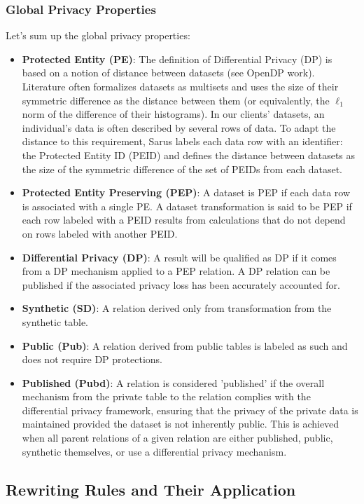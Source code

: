 \documentclass[letterpaper]{article} %
\begin{document}
\subsubsection{Global Privacy Properties}
\label{sec:global_privacy_properties}
Let's sum up the global privacy properties:
\begin{itemize}
    \item \textbf{Protected Entity (PE)}: The definition of Differential Privacy (DP) is based on a notion of distance between datasets (see OpenDP work). Literature often formalizes datasets as multisets and uses the size of their symmetric difference as the distance between them (or equivalently, the $\ell_1$ norm of the difference of their histograms). In our clients' datasets, an individual's data is often described by several rows of data. To adapt the distance to this requirement, Sarus labels each data row with an identifier: the Protected Entity ID (PEID) and defines the distance between datasets as the size of the symmetric difference of the set of PEIDs from each dataset.
    \item \textbf{Protected Entity Preserving (PEP)}: A dataset is PEP if each data row is associated with a single PE. A dataset transformation is said to be PEP if each row labeled with a PEID results from calculations that do not depend on rows labeled with another PEID.
    \item \textbf{Differential Privacy (DP)}: A result will be qualified as DP if it comes from a DP mechanism applied to a PEP relation. A DP relation can be published if the associated privacy loss has been accurately accounted for.
    \item \textbf{Synthetic (SD)}: A relation derived only from transformation from the synthetic table.
    \item \textbf{Public (Pub)}: A relation derived from public tables is labeled as such and does not require DP protections.
    \item \textbf{Published (Pubd)}: A relation is considered 'published' if the overall mechanism from the private table to the relation complies with the differential privacy framework, ensuring that the privacy of the private data is maintained provided the dataset is not inherently public. This is achieved when all parent relations of a given relation are either published, public, synthetic themselves, or use a differential privacy mechanism.
\end{itemize}

\subsection{Rewriting Rules and Their Application}
\end{document}
